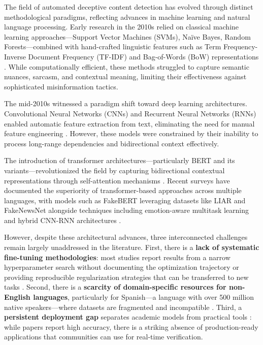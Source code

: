 \documentclass[informatics,article,submit,pdftex,moreauthors]{Definitions/mdpi}
\begin{document}
The field of automated deceptive content detection has evolved through distinct methodological paradigms, reflecting advances in machine learning and natural language processing.  Early research in the 2010s relied on classical machine learning approaches—Support Vector Machines (SVMs), Naïve Bayes, Random Forests—combined with hand-crafted linguistic features such as Term Frequency-Inverse Document Frequency (TF-IDF) and Bag-of-Words (BoW) representations \citep{shu2017fake, ali2022fake, perez2018automatic}. While computationally efficient, these methods struggled to capture semantic nuances, sarcasm, and contextual meaning, limiting their effectiveness against sophisticated misinformation tactics. 

The mid-2010s witnessed a paradigm shift toward deep learning architectures.  Convolutional Neural Networks (CNNs) and Recurrent Neural Networks (RNNs) enabled automatic feature extraction from text, eliminating the need for manual feature engineering \citep{nasir2021fake, zhou2020survey}. However, these models were constrained by their inability to process long-range dependencies and bidirectional context effectively. 

The introduction of transformer architectures—particularly BERT \citep{devlin2018bert} and its variants—revolutionized the field by capturing bidirectional contextual representations through self-attention mechanisms \citep{vaswani2017attention}. Recent surveys \citep{singh2024comprehensive, alghamdi2024comprehensive} have documented the superiority of transformer-based approaches across multiple languages, with models such as FakeBERT \citep{kaliyar2021fakebert} leveraging datasets like LIAR \citep{wang2017liar} and FakeNewsNet alongside techniques including emotion-aware multitask learning \citep{choudhry2024emotion} and hybrid CNN-RNN architectures \citep{nasir2021fake}. 

However, despite these architectural advances, three interconnected challenges remain largely unaddressed in the literature. First, there is a \textbf{lack of systematic fine-tuning methodologies}: most studies report results from a narrow hyperparameter search without documenting the optimization trajectory or providing reproducible regularization strategies that can be transferred to new tasks \citep{blanco2024enhancing, martinez2021fake}. Second, there is a \textbf{scarcity of domain-specific resources for non-English languages}, particularly for Spanish—a language with over 500 million native speakers—where datasets are fragmented and incompatible \citep{singh2024comprehensive, posadas2019detection}. Third, a \textbf{persistent deployment gap} separates academic models from practical tools \citep{ali2022fake}: while papers report high accuracy, there is a striking absence of production-ready applications that communities can use for real-time verification.
\end{document}

